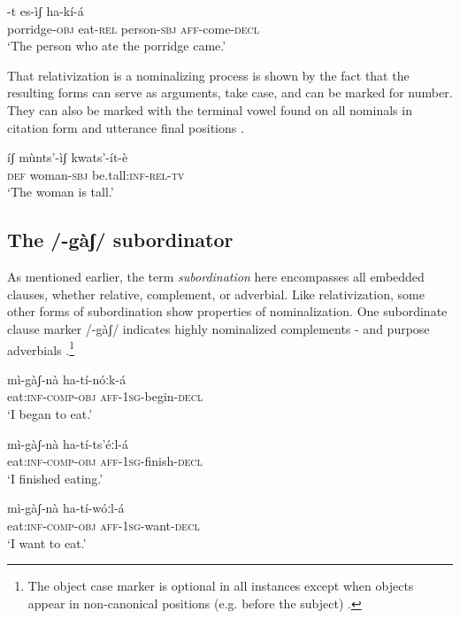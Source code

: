 \documentclass[output=paper]{langsci/langscibook}
\begin{document}
\ea\label{ex:mahland:44}
\gll [kàːl-là           mí]-t     es-ìʃ           ha-kí-{\downstep}á\\
{\db}porridge\textsc{{}-obj}   eat\textsc{{}-rel}    person\textsc{{}-sbj}   \textsc{aff}-come\textsc{{}-decl} \\
\glt `The person who ate the porridge came.'
\z

That relativization is a nominalizing process is shown by the fact that the resulting forms can serve as arguments, take case, and can be marked for number. They can also be marked with the terminal vowel found on all nominals in citation form and utterance final positions . 


\ea\label{ex:mahland:45}
\gll íʃ        mùnts'-ìʃ        kwats'-ít-è\\
\textsc{def}      woman-\textsc{sbj}     be.tall\textsc{:inf-rel-tv}\\
\glt `The woman is tall.'
\z

\subsection{The /-gàʃ/ subordinator}\label{sec:mahland:2.3}

As mentioned earlier, the term \textit{subordination} here encompasses all embedded clauses, whether relative, complement, or adverbial. Like relativization, some other forms of subordination show properties of nominalization. One subordinate clause marker /-gàʃ/ indicates highly nominalized complements - and purpose adverbials .\footnote{The object case marker is optional in all instances except when objects appear in non-canonical positions (e.g. before the subject) \citep[327]{Ahland2012}.}


\ea\label{ex:mahland:46}
\gll mì-gàʃ-nà              ha-tí-nóːk-{\downstep}á  \\
eat:\textsc{inf-comp-obj}   \textsc{aff-1sg}{}-begin-\textsc{decl}   \\
\glt `I began to eat.'
\z

\ea\label{ex:mahland:47}
\gll mì-gàʃ-nà              ha-tí-ts'éːl-{\downstep}á  \\
eat:\textsc{inf-comp-obj}   \textsc{aff-1sg}{}-finish-\textsc{decl}   \\
\glt `I finished eating.'
\z

\ea\label{ex:mahland:48}
\gll mì-gàʃ-nà              ha-tí-wóːl-{\downstep}á  \\
eat:\textsc{inf-comp-obj}   \textsc{aff-1sg}{}-want-\textsc{decl}   \\
\glt `I want to eat.'
\z
\end{document}
